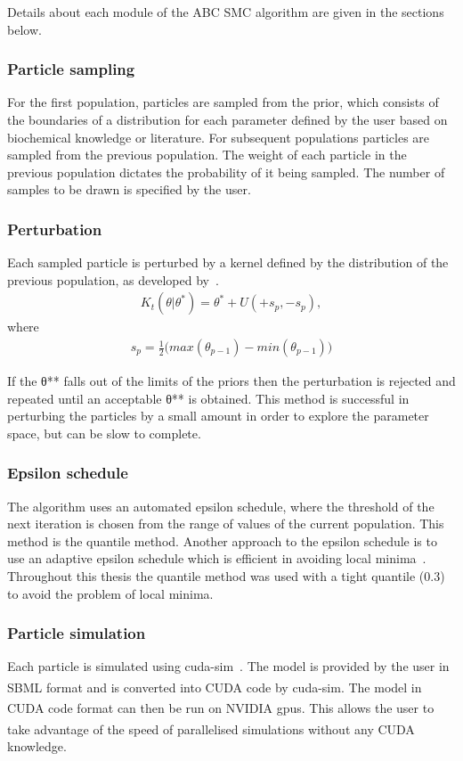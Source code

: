 \noindent Details about each module of the ABC SMC algorithm are given in the sections below. 


\subsubsection{Particle sampling}
\label{sec:part_samp}
For the first population, particles are sampled from the prior, which consists of the boundaries of a distribution for each parameter defined by the user based on biochemical knowledge or literature. For subsequent populations particles are sampled from the previous population. The weight of each particle in the previous population dictates the probability of it being sampled. The number of samples to be drawn is specified by the user.  

\subsubsection{Perturbation}
\label{sec:pertub}
Each sampled particle is perturbed by a kernel defined by the distribution of the previous population, as developed by~\textcite{Toni:2009tr}. 
\begin{align}
K_t(\theta|\theta^* ) = \theta^* + U(+s_p, -s_p),
\end{align}
\noindent  where
\begin{align}
s_p = \frac{1}{2} \big (max(\theta_{p-1}) - min(\theta_{p-1}) \big )
\end{align}

\noindent If the θ** falls out of the limits of the priors then the perturbation is rejected and repeated until an acceptable θ** is obtained. This method is successful in perturbing the particles by a small amount in order to explore the parameter space, but can be slow to complete. 


\subsubsection{Epsilon schedule}
The algorithm uses an automated epsilon schedule, where the threshold of the next iteration is chosen from the range of values of the current population. This method is the quantile method. Another approach to the epsilon schedule is to use an adaptive epsilon schedule which is efficient in avoiding local minima~\autocite{Silk:2013bi}. Throughout this thesis the quantile method was used with a tight quantile (0.3) to avoid the problem of local minima. 

\subsubsection{Particle simulation}
\label{sec:sim}
Each particle is simulated using cuda-sim~\autocite{Zhou:2011hp}. The model is provided by the user in SBML format and is converted into CUDA\textsuperscript{\textregistered} code by cuda-sim. The model in CUDA\textsuperscript{\textregistered} code format can then be run on NVIDIA\textsuperscript{\textregistered} \acrshort{gpu}s. This allows the user to take advantage of the speed of parallelised simulations without any CUDA\textsuperscript{\textregistered} knowledge. 


